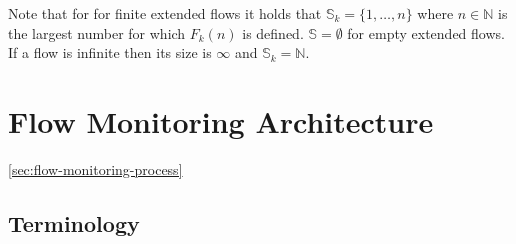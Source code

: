 
Note that for for finite extended flows it holds that $\mathbb{S}_k = \{1, \ldots, n\}$ where $n \in \mathbb{N}$ is the largest number for which $F_k(n)$ is defined. $\mathbb{S} = \emptyset$ for empty extended flows. If a flow is infinite then its size is $\infty$ and $\mathbb{S}_k = \mathbb{N}$.


\section{Flow Monitoring Architecture}



\ref{sec:flow-monitoring-process}


\subsection{Terminology}


